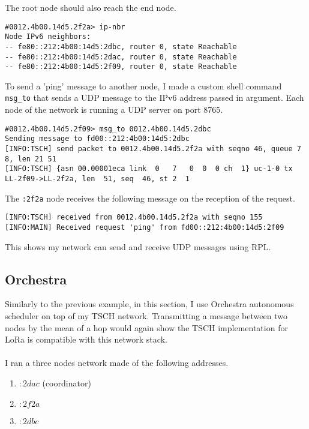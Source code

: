The root node should also reach the end node.

\begin{lstlisting}[language=none]
#0012.4b00.14d5.2f2a> ip-nbr
Node IPv6 neighbors:
-- fe80::212:4b00:14d5:2dbc, router 0, state Reachable
-- fe80::212:4b00:14d5:2dac, router 0, state Reachable
-- fe80::212:4b00:14d5:2f09, router 0, state Reachable
\end{lstlisting}

To send a 'ping' message to another node, I made a custom shell
command \lstinline{msg_to} that sends a UDP message to the IPv6 address
passed in argument.
Each node of the network is running a UDP server on port 8765.

\begin{lstlisting}[language=none]
#0012.4b00.14d5.2f09> msg_to 0012.4b00.14d5.2dbc
Sending message to fd00::212:4b00:14d5:2dbc
[INFO:TSCH] send packet to 0012.4b00.14d5.2f2a with seqno 46, queue 7 8, len 21 51
[INFO:TSCH] {asn 00.00001eca link  0   7   0  0  0 ch  1} uc-1-0 tx LL-2f09->LL-2f2a, len  51, seq  46, st 2  1
\end{lstlisting}

The \lstinline{:2f2a} node receives the following message on the reception of the
request.

\begin{lstlisting}[language=none]
[INFO:TSCH] received from 0012.4b00.14d5.2f2a with seqno 155
[INFO:MAIN] Received request 'ping' from fd00::212:4b00:14d5:2f09
\end{lstlisting}

This shows my network can send and receive UDP messages using RPL.

\subsection{Orchestra}

Similarly to the previous example, in this section, I use Orchestra autonomous
scheduler on top of my TSCH network.
Transmitting a message between two nodes by the mean of a hop would again show
the TSCH implementation for LoRa is compatible with this network stack.

\paragraph{}

I ran a three nodes network made of the following addresses.

\begin{enumerate}
  \item $:2dac$ (coordinator)
  \item $:2f2a$
  \item $:2dbc$
\end{enumerate}

